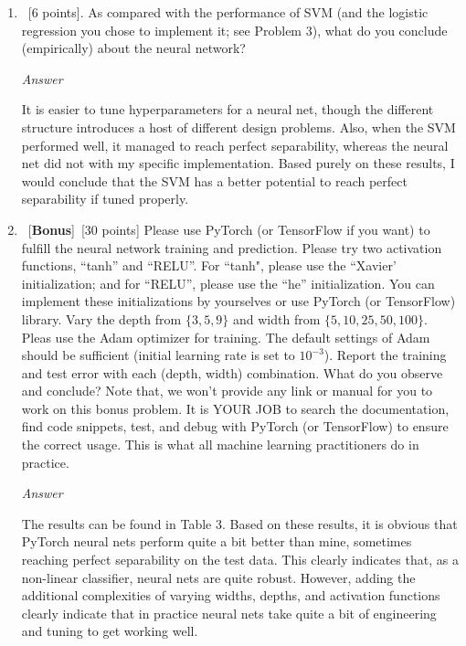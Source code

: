\documentclass[12pt, fullpage,letterpaper]{article}
\begin{document}
\begin{enumerate}
\begin{enumerate}
	\item~[6 points]. As compared with the performance of SVM (and the logistic regression you chose to implement it; see Problem 3), what do you conclude (empirically) about the neural network?
	
	\emph{Answer}
	
	It is easier to tune hyperparameters for a neural net, though the different structure introduces a host of different design problems. Also, when the SVM performed well, it managed to reach perfect separability, whereas the neural net did not with my specific implementation. Based purely on these results, I would conclude that the SVM has a better potential to reach perfect separability if tuned properly.
	
	
	\item~[\textbf{Bonus}]~[30 points] Please use PyTorch (or TensorFlow if you want) to fulfill the neural network training and prediction. Please try two activation functions, ``tanh'' and ``RELU''.  For ``tanh", please use the ``Xavier' initialization; and for ``RELU'', please use the ``he'' initialization. You can implement these initializations by yourselves or use PyTorch (or TensorFlow) library. 
	Vary the depth from $\{3, 5, 9\} $ and width from $\{5, 10, 25, 50, 100\}$. Pleas use the Adam optimizer for training. The default settings of Adam should be sufficient (\eg initial learning rate is set to $10^{-3}$). 
	 Report the training and test error with each (depth, width) combination. What do you observe and conclude? Note that, we won't provide any link or manual for you to work on this bonus problem. It is YOUR JOB to search the documentation, find  code snippets, test, and debug with PyTorch (or TensorFlow) to ensure the correct usage. This is what all machine learning practitioners do in practice. 
	 
	 \emph{Answer}
	 
	 The results can be found in Table 3. Based on these results, it is obvious that PyTorch neural nets perform quite a bit better than mine, sometimes reaching perfect separability on the test data. This clearly indicates that, as a non-linear classifier, neural nets are quite robust. However, adding the additional complexities of varying widths, depths, and activation functions clearly indicate that in practice neural nets take quite a bit of engineering and tuning to get working well.
	 

\end{enumerate}
\end{enumerate}
\end{document}
